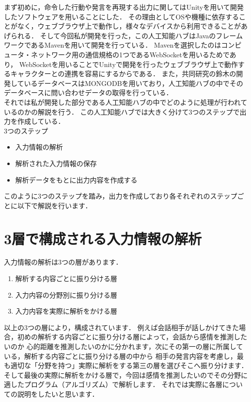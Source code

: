 
まず初めに，命令した行動や発言を再現する出力に関してはUnityを用いて開発したソフトウェアを用いることにした．
その理由としてOSや機種に依存することがなく，ウェブブラウザ上で動作し，様々なデバイスから利用できることがあげられる．
そして今回私が開発を行った，この人工知能ハブはJavaのフレームワークであるMavenを用いて開発を行っている．
Mavenを選択したのはコンピュータ・ネットワーク用の通信規格の1つであるWebSocketを用いるためであり，
WebSocketを用いることでUnityで開発を行ったウェブブラウザ上で動作するキャラクターとの連携を容易にするからである．
また，共同研究の鈴木の開発しているデータベースはMONGODBを用いており，人工知能ハブの中でそのデータベースに問い合わせデータの取得を行っている．
\\
それでは私が開発した部分である人工知能ハブの中でどのように処理が行われているのかの解説を行う．
この人工知能ハブでは大きく分けて3つのステップで出力を作成している．\\

3つのステップ
\begin{itemize}
	\item{入力情報の解析}
	\item{解析された入力情報の保存}
	\item{解析データをもとに出力内容を作成する}
\end{itemize}
このように3つのステップを踏み，出力を作成しており各それぞれのステップごとに以下で解説を行います．
\section{3層で構成される入力情報の解析}
入力情報の解析は3つの層があります．
\begin{enumerate}
	\item{解析する内容ごとに振り分ける層}
	\item{入力内容の分野別に振り分ける層}
	\item{入力内容を実際に解析をかける層}
\end{enumerate}
以上の3つの層により，構成されています．
例えば会話相手が話しかけてきた場合，初めの解析する内容ごとに振り分ける層によって，会話から感情を推測したいのか
心的距離を推測したいのかに分かれます，次にその第一の層に所属している，解析する内容ごとに振り分ける層の中から
相手の発言内容を考慮し，最も適切な「分野を持つ」実際に解析をする第三の層を選びそこへ振り分けます．
そして最後の実際に解析をかける層で，今回は感情を推測したいのでその分野に適したプログラム（アルゴリズム）で解析します．
それでは実際に各層についての説明をしたいと思います．\\
